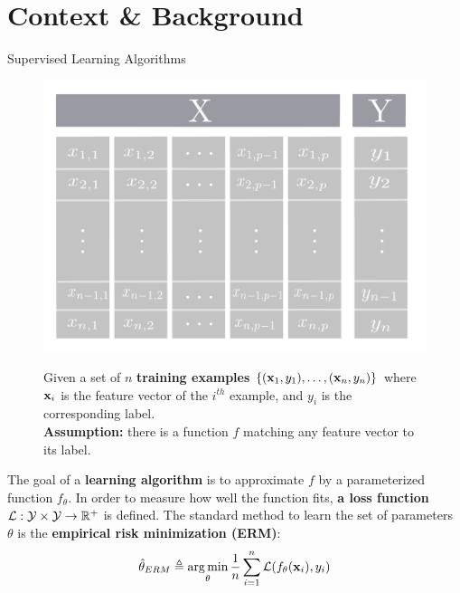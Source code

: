 \section{Context \& Background}


\begin{frame}{Supervised Learning Algorithms}
  \begin{figure}
    \begin{minipage}[!ht]{0.42\textwidth}
      \includegraphics[width=\textwidth]{images/TableauDonneeApprentissage.pdf}
    \end{minipage} \hspace{0.3cm}
    \begin{minipage}[!ht]{0.52\textwidth}
      Given a set of $n$ \textbf{training examples} $\left\{ (\mathbf{x}_1, y_1),\dots,(\mathbf{x}_n, y_n) \right\}$ where $\mathbf{x}_i$ is the feature vector of the $i^{th}$ example, and $y_i$ is the corresponding label. \\
      \textbf{Assumption:} there is a function $f$ matching any feature vector to its label.
   \end{minipage}
  \end{figure}
    The goal of a \textbf{learning algorithm} is to approximate $f$ by a parameterized function $f_\theta$.
    In order to measure how well the function fits, \textbf{a loss function} $\mathcal{L}: \mathcal{Y} \times \mathcal{Y} \rightarrow {\ensuremath \mathbb{R}}^{+}$ is defined.
    The standard method to learn the set of parameters $\theta$ is the \textbf{empirical risk minimization (ERM)}:
  \begin{equation*}
    \hat{\theta}_{ERM} \triangleq \operatorname*{arg\,min}_{\theta} \frac{1}{n} \sum_{i=1}^{n} \mathcal{L} (f_{\theta} (\mathbf{x}_i), y_i )
  \end{equation*}
\end{frame}



